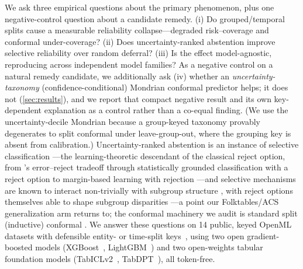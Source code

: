\documentclass[11pt]{article}
\begin{document}
We ask three empirical questions about the primary phenomenon, plus one negative-control question about
a candidate remedy. (i) Do grouped/temporal splits cause a measurable reliability
collapse---degraded risk--coverage and conformal under-coverage? (ii) Does uncertainty-ranked abstention
improve selective reliability over random deferral? (iii) Is the effect model-agnostic, reproducing across
independent model families? As a negative control on a natural remedy candidate, we additionally ask
(iv) whether an \emph{uncertainty-taxonomy} (confidence-conditional) Mondrian conformal predictor helps;
it does not (\cref{sec:results}), and we report that compact negative result and its own key-dependent
explanation as a control rather than a co-equal finding. (We use the uncertainty-decile Mondrian because a
group-keyed taxonomy provably degenerates to split conformal under leave-group-out, where the grouping key
is absent from calibration.)
Uncertainty-ranked abstention is an instance of selective classification
\citep{geifman2017selective}---the learning-theoretic descendant of the classical reject option, from
\citet{chow1970reject}'s error--reject tradeoff through statistically grounded classification with a
reject option \citep{herbei2006reject} to margin-based learning with rejection
\citep{cortes2016rejection}---and selective mechanisms are known to interact non-trivially with
subgroup structure \citep{jones2021selective}, with reject options themselves able to shape
subgroup disparities \citep{kamiran2018reject}---a point our Folktables/ACS generalization arm
returns to; the conformal machinery we audit is standard split (inductive) conformal
\citep{papadopoulos2002inductive,vovk2005algorithmic,angelopoulos2023conformal}.
We answer these questions on 14 public, keyed OpenML datasets with defensible entity- or time-split
keys~\citep{vanschoren2014openml},
using two open gradient-boosted models (XGBoost~\citep{chen2016xgboost}, LightGBM~\citep{ke2017lightgbm}) and two
open-weights tabular foundation models (TabICLv2~\citep{qu2026tabicl}, TabDPT~\citep{ma2024tabdpt}), all token-free.
\end{document}
